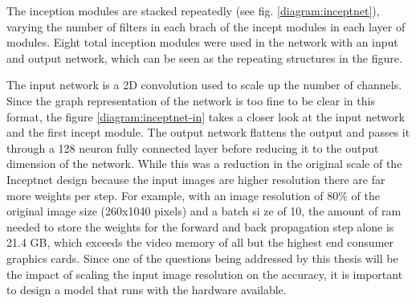 The inception modules are stacked repeatedly (see fig. \ref{diagram:inceptnet}), varying the number of filters in each brach of the incept modules in each layer of modules. Eight total inception modules were used in the network with an input and output network, which can be seen as the repeating structures in the figure.

The input network is a 2D convolution used to scale up the number of channels. Since the graph representation of the network is too fine to be clear in this format, the figure \ref{diagram:inceptnet-in} takes a closer look at the input network and the first incept module. The output network flattens the output and passes it through a 128 neuron fully connected layer before reducing it to the output dimension of the network. While this was a reduction in the original scale of the Inceptnet design because the input images are higher resolution there are far more weights per step. For example, with an image resolution of 80\% of the original image size (260x1040 pixels) and a batch si ze of 10, the amount of ram needed to store the weights for the forward and back propagation step alone is 21.4 GB, which exceeds the video memory of all but the highest end consumer graphics cards. Since one of the questions being addressed by this thesis will be the impact of scaling the input image resolution on the accuracy, it is important to design a model that runs with the hardware available.

